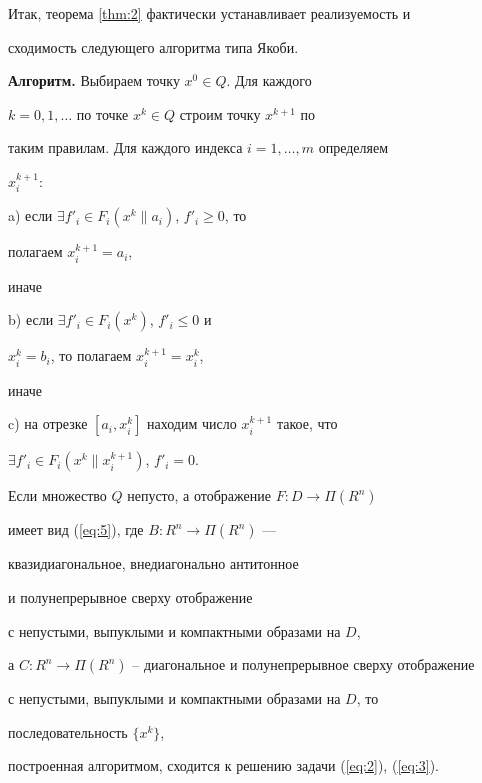Итак, теорема \ref{thm:2} фактически устанавливает реализуемость и


сходимость следующего алгоритма типа Якоби.


\medskip





{\bf Алгоритм.} Выбираем точку $x^0 \in Q$. Для каждого


$k=0,1,\dotsc$ по точке $x^k \in Q$ строим точку $x^{k+1}$ по


таким правилам. Для каждого индекса $i=1,\dotsc,m$ определяем


$x^{k+1}_i$:





a) если $\exists f'_i \in F_i (x^k \| a_i)$, $f'_i \ge 0$, то


полагаем $x^{k+1}_i=a_i$,





\noindent{}иначе





b) если $\exists f'_i \in F_i (x^k)$, $f'_i \le 0$ и


$x^k_i=b_i$, то полагаем $x^{k+1}_i=x^k_i$,





\noindent{}иначе





c) на отрезке $[a_i,x^k_i]$ находим число $x^{k+1}_i$ такое, что


$\exists f'_i \in F_i (x^k \| x^{k+1}_i)$, $f'_i = 0$.








\begin{cors}\label{cor:1}


Если множество  $Q$ непусто, а отображение $F: D \to \Pi (R^{n})$


имеет вид (\ref{eq:5}), где $B: R^n \to \Pi (R^n)$ ---


квазидиагональное, внедиагонально антитонное


и полунепрерывное сверху отображение


с непустыми, выпуклыми и компактными образами на $D$,


а $C: R^n \to \Pi (R^n)$ -- диагональное и полунепрерывное сверху отображение


с непустыми, выпуклыми и компактными образами на $D$, то 


последовательность $\{x^{k}\}$,


построенная алгоритмом, сходится к решению задачи (\ref{eq:2}), (\ref{eq:3}).


\end{cors}





